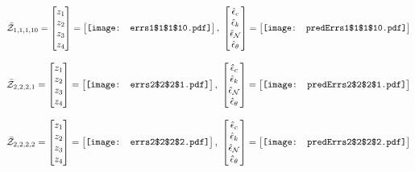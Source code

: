 \documentclass[12pt]{article}
\begin{document}
\begin{gather*}
\bar{\mathcal{Z}}_{1,1,1,10}=\begin{bmatrix}
z_1\\
z_2\\
z_3\\
z_4
 \end{bmatrix}= \begin{bmatrix}
\vcenter{\hbox{\texttt{[image: errs1\$1\$1\$10.pdf]}}}
 \end{bmatrix},\,\, \begin{bmatrix}
\hat{\epsilon}_c\\\hat{\epsilon}_k\\\hat{\epsilon}_\mathcal{N}\\\hat{\epsilon}_\theta
 \end{bmatrix}=\begin{bmatrix}
\vcenter{\hbox{\texttt{[image: predErrs1\$1\$1\$10.pdf]}}}
 \end{bmatrix}
\end{gather*}


\begin{gather*}
\bar{\mathcal{Z}}_{2,2,2,1}=\begin{bmatrix}
z_1\\
z_2\\
z_3\\
z_4
 \end{bmatrix}= \begin{bmatrix}
\vcenter{\hbox{\texttt{[image: errs2\$2\$2\$1.pdf]}}}
 \end{bmatrix},\,\, \begin{bmatrix}
\hat{\epsilon}_c\\\hat{\epsilon}_k\\\hat{\epsilon}_\mathcal{N}\\\hat{\epsilon}_\theta
 \end{bmatrix}=\begin{bmatrix}
\vcenter{\hbox{\texttt{[image: predErrs2\$2\$2\$1.pdf]}}}
 \end{bmatrix}
\end{gather*}


\begin{gather*}
\bar{\mathcal{Z}}_{2,2,2,2}=\begin{bmatrix}
z_1\\
z_2\\
z_3\\
z_4
 \end{bmatrix}= \begin{bmatrix}
\vcenter{\hbox{\texttt{[image: errs2\$2\$2\$2.pdf]}}}
 \end{bmatrix},\,\, \begin{bmatrix}
\hat{\epsilon}_c\\\hat{\epsilon}_k\\\hat{\epsilon}_\mathcal{N}\\\hat{\epsilon}_\theta
 \end{bmatrix}=\begin{bmatrix}
\vcenter{\hbox{\texttt{[image: predErrs2\$2\$2\$2.pdf]}}}
 \end{bmatrix}
\end{gather*}
\end{document}
